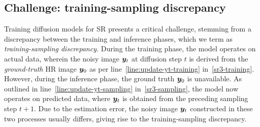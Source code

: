







\subsection{Challenge: training-sampling discrepancy}
\label{subsec:3.2}


Training diffusion models for SR presents a critical challenge, stemming from a discrepancy between the training and inference phases, which we term as \emph{training-sampling discrepancy}. During the training phase, the model operates on actual data, wherein the noisy image ${\bm{y}}_t$ at diffusion step $t$ is derived from the \emph{ground-truth} HR image ${\bm{y}}_0$ as per line~\ref{line:update-yt-training} in~\cref{sr3-training}. However, during the inference phase, the ground truth ${\bm{y}}_0$ is unavailable. As outlined in line~\ref{line:update-yt-sampling} in~\cref{sr3-sampling}, the model now operates on predicted data, where ${\bm{y}}_t$ is obtained from the preceding sampling step $t+1$. Due to the estimation error, the noisy image ${{\bm{y}}}_t$ constructed in these two processes usually differs, giving rise to the training-sampling discrepancy.

